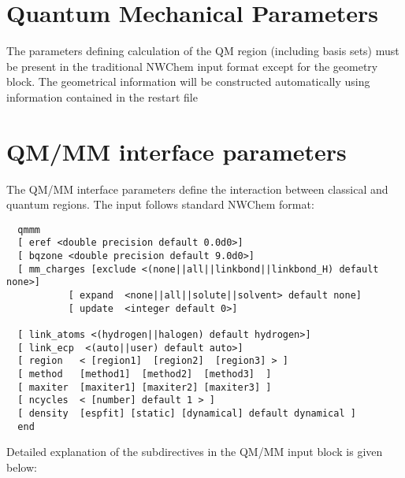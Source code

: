 \section{Quantum Mechanical Parameters}
 
The parameters defining calculation of the QM region (including basis sets) 
must be present in the traditional NWChem input format
except for the geometry block. The geometrical information will
be constructed automatically using information contained in the restart file

\section{QM/MM interface parameters}

The QM/MM interface parameters define the interaction between classical and quantum regions.
The  input follows standard NWChem format:
\begin{verbatim}
  qmmm
  [ eref <double precision default 0.0d0>]
  [ bqzone <double precision default 9.0d0>]
  [ mm_charges [exclude <(none||all||linkbond||linkbond_H) default none>]
           [ expand  <none||all||solute||solvent> default none]
           [ update  <integer default 0>] 
        
  [ link_atoms <(hydrogen||halogen) default hydrogen>]
  [ link_ecp  <(auto||user) default auto>]
  [ region   < [region1]  [region2]  [region3] > ]
  [ method   [method1]  [method2]  [method3]  ]
  [ maxiter  [maxiter1] [maxiter2] [maxiter3] ]
  [ ncycles  < [number] default 1 > ]
  [ density  [espfit] [static] [dynamical] default dynamical ]
  end
\end{verbatim}

Detailed explanation of the subdirectives in the QM/MM input block is given below:


